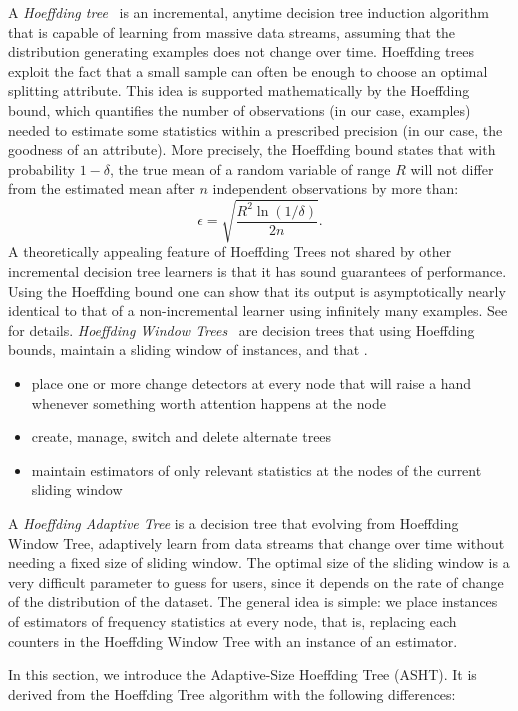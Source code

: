 A {\em Hoeffding tree}~\cite{vfdt} is an incremental, anytime decision tree 
induction algorithm that is capable of learning from massive data streams, 
assuming that the distribution generating examples does not change over time.
Hoeffding trees exploit the fact that a small sample can often be enough to choose 
an optimal splitting attribute. This idea is supported mathematically by the 
Hoeffding bound, which quantifies the number of observations (in our case, 
examples) needed to estimate some statistics within a prescribed precision (in 
our case, the goodness of an attribute). 
More precisely, the Hoeffding bound states that with probability $1 - \delta$, 
the true mean of a random variable of range $R$ will not differ from the estimated 
mean after $n$ independent observations by more than:
$$ \epsilon = \sqrt{\frac{R^2 \ln(1/\delta)}{2n}}.$$
A theoretically appealing feature of Hoeffding Trees not shared by other 
incremental decision tree learners is that it has sound guarantees of performance. 
Using the Hoeffding bound one can show that its output is asymptotically nearly 
identical to that of a non-incremental learner using infinitely many examples.
See \cite{vfdt} for details. 
\ENDOMIT
\BEGINOMIT
{\em Hoeffding Window Trees}~\cite{} are decision trees 
that using Hoeffding bounds, maintain a sliding window of instances, 
and that .

\begin{itemize}
 \item place one or more change detectors at every node that will
raise a hand whenever something worth attention happens at the node
 \item create, manage, switch and delete alternate trees
 \item maintain estimators of only relevant statistics at the nodes of the current sliding window
\end{itemize}

A {\em Hoeffding Adaptive Tree} is a decision tree that evolving from Hoeffding 
Window Tree, adaptively learn from data streams that change over time
without needing a fixed size of sliding window. The optimal size of the
sliding window is a very difficult parameter to guess for users, since it depends
on the rate of change of the distribution of the dataset.
The general idea is simple: we place instances of estimators of frequency
statistics at every node, that is, replacing each
counters in the Hoeffding Window Tree with an instance of an estimator.
\ENDOMIT

In this section, we introduce the Adaptive-Size Hoeffding Tree (ASHT). It is derived
from the Hoeffding Tree algorithm with the following differences:

